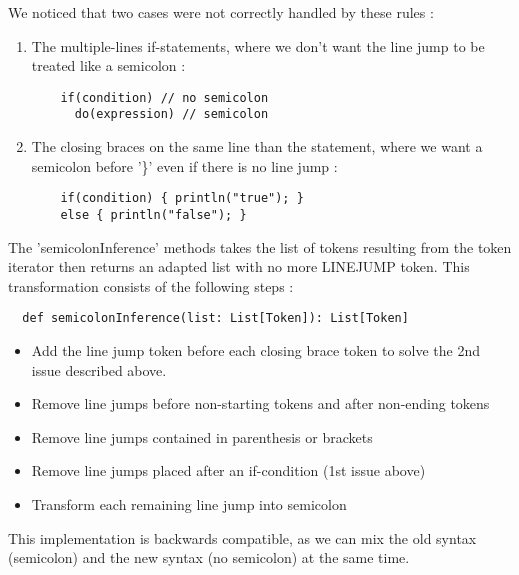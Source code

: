 \textnormal{We noticed that two cases were not correctly handled by these rules
  :}
\begin{enumerate}
\item The multiple-lines if-statements, where we don't want the line jump to be
  treated like a semicolon :
  \begin{lstlisting}
    if(condition) // no semicolon
      do(expression) // semicolon
  \end{lstlisting}
\item The closing braces on the same line than the statement, where we want a
  semicolon before '\}' even if there is no line jump :
  \begin{lstlisting}
    if(condition) { println("true"); }
    else { println("false"); }
  \end{lstlisting}
\end{enumerate}

\textnormal{The 'semicolonInference' methods takes the list of tokens resulting
  from the token iterator then returns an adapted list with no more LINEJUMP 
  token. This transformation consists of the following steps :}


\begin{lstlisting}
  def semicolonInference(list: List[Token]): List[Token]
\end{lstlisting}

\begin{itemize}
\item Add the line jump token before each closing brace token to solve the 2nd
  issue described above.
\item Remove line jumps before non-starting tokens and after non-ending tokens
\item Remove line jumps contained in parenthesis or brackets
\item Remove line jumps placed after an if-condition (1st issue above)
\item Transform each remaining line jump into semicolon
\end{itemize}

\textnormal{This implementation is backwards compatible, as we can mix the old
  syntax (semicolon) and the new syntax (no semicolon) at the same time.}

